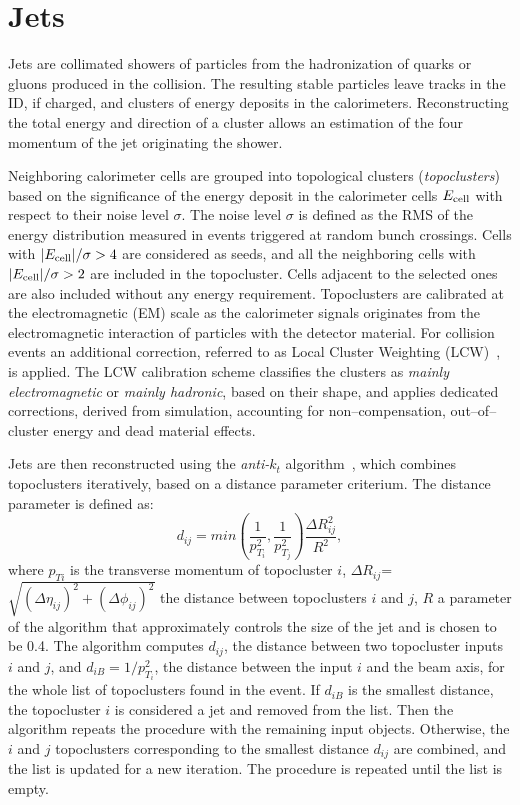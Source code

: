 \section{Jets}
\label{sec:jets}

Jets are collimated showers of particles from the hadronization of
quarks or gluons produced in the collision.
The resulting stable particles leave tracks in the ID, if charged, and
clusters of energy deposits in the calorimeters.
Reconstructing the total energy and direction of a cluster allows an
estimation of the four momentum of the jet originating the shower.

Neighboring calorimeter cells are grouped into topological clusters
({\it topoclusters}) based on the significance of the energy deposit
in the calorimeter cells $E_{\rm cell}$ with respect to their noise
level $\sigma$. The noise level $\sigma$ is defined as the RMS of the
energy distribution measured in events triggered at random bunch
crossings. Cells with $|E_{\rm cell}|/\sigma>4$ are considered as
seeds, and all the neighboring cells with $|E_{\rm cell}|/\sigma > 2$
are included in the topocluster. Cells adjacent to the selected ones
are also included without any energy requirement.
Topoclusters are calibrated at the electromagnetic (EM) scale as the
calorimeter signals originates from the electromagnetic interaction of
particles with the detector material. For \eighttev{} collision events
an additional correction, referred to as Local Cluster Weighting
(LCW)~\cite{lcwcalib}, is applied. The LCW calibration
scheme classifies the clusters as {\it mainly electromagnetic} or
{\it mainly hadronic}, based on their shape, and applies
dedicated corrections, derived from simulation, accounting for
non--compensation, out--of--cluster energy and dead material effects. 

Jets are then reconstructed using the {\it anti-$k_t$}
algorithm~\cite{antiktalgo}, which combines topoclusters iteratively,
based on a distance parameter criterium. The distance parameter is
defined as:
\begin{equation}
d_{ij}=min(\frac{1}{p_{T_i}^2},\frac{1}{p_{T_j}^2})\frac{\Delta R_{ij}^{2}}{R^{2}},
\end{equation}
where $p_{Ti}$ is the transverse momentum of topocluster $i$, 
$\Delta R_{ij}$=$\sqrt{(\Delta\eta_{ij})^{2}+(\Delta\phi_{ij})^{2}}$ the distance 
between topoclusters $i$ and
$j$, $R$ a parameter of the algorithm that approximately controls the size
of the jet and is chosen to be 0.4.
The algorithm computes $d_{ij}$, the distance between two topocluster
inputs $i$ and $j$, and $d_{iB}=1/p_{T_i}^2$,  the distance between the input $i$
and the beam axis, for the whole list of topoclusters found in the
event. If $d_{iB}$ is the smallest distance, the
topocluster $i$ is considered a jet and removed from the list. Then the
algorithm repeats the procedure with the remaining input objects.
Otherwise, the $i$ and $j$ topoclusters corresponding to the smallest
distance $d_{ij}$ are combined, and the list is updated for a new
iteration.
The procedure is repeated until the list is empty.

